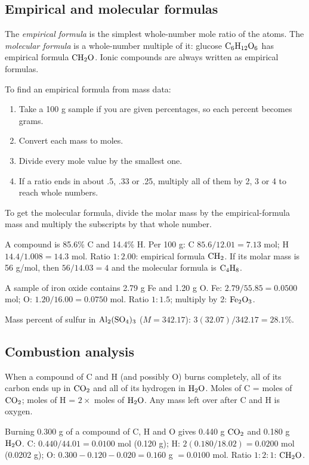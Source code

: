 \documentclass[11pt]{article}
\begin{document}
\subsection{Empirical and molecular formulas}
The \emph{empirical formula} is the simplest whole-number mole ratio of the atoms. The \emph{molecular formula} is a whole-number multiple of it: glucose $\ce{C6H12O6}$ has empirical formula $\ce{CH2O}$. Ionic compounds are always written as empirical formulas.

To find an empirical formula from mass data:
\begin{enumerate}
\item Take a 100 g sample if you are given percentages, so each percent becomes grams.
\item Convert each mass to moles.
\item Divide every mole value by the smallest one.
\item If a ratio ends in about .5, .33 or .25, multiply all of them by 2, 3 or 4 to reach whole numbers.
\end{enumerate}
To get the molecular formula, divide the molar mass by the empirical-formula mass and multiply the subscripts by that whole number.

 A compound is 85.6\% C and 14.4\% H. Per 100 g: C $85.6/12.01 = 7.13$ mol; H $14.4/1.008 = 14.3$ mol. Ratio $1 : 2.00$: empirical formula $\ce{CH2}$. If its molar mass is 56 g/mol, then $56/14.03 = 4$ and the molecular formula is $\ce{C4H8}$.

 A sample of iron oxide contains 2.79 g Fe and 1.20 g O. Fe: $2.79/55.85 = 0.0500$ mol; O: $1.20/16.00 = 0.0750$ mol. Ratio $1 : 1.5$; multiply by 2: $\ce{Fe2O3}$.

 Mass percent of sulfur in $\ce{Al2(SO4)3}$ ($M = 342.17$): $3(32.07)/342.17 = 28.1\%$.

\subsection{Combustion analysis}
When a compound of C and H (and possibly O) burns completely, all of its carbon ends up in $\ce{CO2}$ and all of its hydrogen in $\ce{H2O}$. Moles of C = moles of $\ce{CO2}$; moles of H = $2 \times$ moles of $\ce{H2O}$. Any mass left over after C and H is oxygen.

 Burning 0.300 g of a compound of C, H and O gives 0.440 g $\ce{CO2}$ and 0.180 g $\ce{H2O}$. C: $0.440/44.01 = 0.0100$ mol (0.120 g); H: $2(0.180/18.02) = 0.0200$ mol (0.0202 g); O: $0.300 - 0.120 - 0.020 = 0.160$ g $= 0.0100$ mol. Ratio $1:2:1$: $\ce{CH2O}$.
\end{document}
